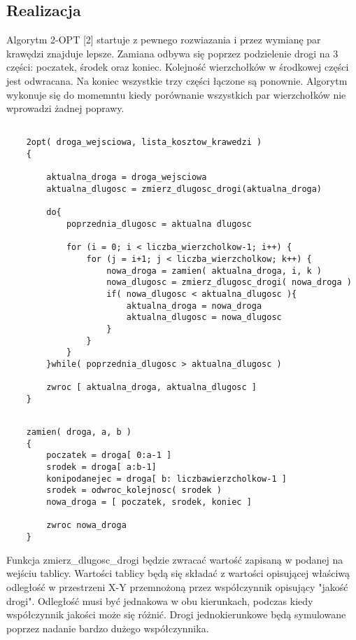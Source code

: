 \documentclass{article}
\begin{document}
\subsection{Realizacja}

Algorytm 2-OPT [2] startuje z pewnego rozwiazania i przez wymianę par krawędzi znajduje lepsze. Zamiana odbywa się poprzez podzielenie drogi na 3 części: poczatek, środek oraz koniec. Kolejność wierzchołków w środkowej części jest odwracana. Na koniec wszystkie trzy części łączone są ponownie. Algorytm wykonuje się do momemntu kiedy porównanie wszystkich par wierzchołków nie wprowadzi żadnej poprawy. \\


\begin{lstlisting}[caption={Główna część algorytmu}]

	2opt( droga_wejsciowa, lista_kosztow_krawedzi )
	{
		
		aktualna_droga = droga_wejsciowa
		aktualna_dlugosc = zmierz_dlugosc_drogi(aktualna_droga)
	
		do{
			poprzednia_dlugosc = aktualna dlugosc

			for (i = 0; i < liczba_wierzcholkow-1; i++) {
				for (j = i+1; j < liczba_wierzcholkow; k++) {
					nowa_droga = zamien( aktualna_droga, i, k )
					nowa_dlugosc = zmierz_dlugosc_drogi( nowa_droga )
					if( nowa_dlugosc < aktualna_dlugosc ){
						aktualna_droga = nowa_droga
						aktualna_dlugosc = nowa_dlugosc				
					}				
				}
			}
		}while( poprzednia_dlugosc > aktualna_dlugosc )
		
		zwroc [ aktualna_droga, aktualna_dlugosc ]
	}

\end{lstlisting}

\begin{lstlisting}[caption={Funkcja modyfikująca aktualną ścieżkę}]

	zamien( droga, a, b )
	{
		poczatek = droga[ 0:a-1 ]
		srodek = droga[ a:b-1]
		konipodanejec = droga[ b: liczbawierzcholkow-1 ]
		srodek = odwroc_kolejnosc( srodek )
		nowa_droga = [ poczatek, srodek, koniec ]
		
		zwroc nowa_droga
	}

\end{lstlisting}


Funkcja zmierz\_dlugosc\_drogi będzie zwracać wartość zapisaną w podanej na wejściu tablicy. Wartości tablicy będą się składać z wartości opisującej właściwą odległość w przestrzeni X-Y przemnożoną przez współczynnik opisujący "jakość drogi". Odległość musi być jednakowa w obu kierunkach, podczas kiedy współczynnik jakości może się różnić. Drogi jednokierunkowe będą symulowane poprzez nadanie bardzo dużego współczynnika. \\
\end{document}
